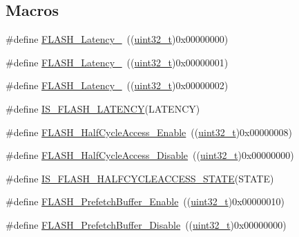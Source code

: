 \subsection*{Macros}
\begin{DoxyCompactItemize}
\item 
\#define \hyperlink{group___flash___latency_ga09afe6e52b819cc074f6111ec42ac3c3}{F\+L\+A\+S\+H\+\_\+\+Latency\+\_}~((\hyperlink{_p_e___types_8h_a33594304e786b158f3fb30289278f5af}{uint32\+\_\+t})0x00000000)
\item 
\#define \hyperlink{group___flash___latency_ga6b7281665340fe8f7919bdfcfd06f8e6}{F\+L\+A\+S\+H\+\_\+\+Latency\+\_}~((\hyperlink{_p_e___types_8h_a33594304e786b158f3fb30289278f5af}{uint32\+\_\+t})0x00000001)
\item 
\#define \hyperlink{group___flash___latency_ga55173ebb5c978459ce18d5e2516e3e89}{F\+L\+A\+S\+H\+\_\+\+Latency\+\_}~((\hyperlink{_p_e___types_8h_a33594304e786b158f3fb30289278f5af}{uint32\+\_\+t})0x00000002)
\item 
\#define \hyperlink{group___flash___latency_gafcbd098d482318a622a58bf168547389}{I\+S\+\_\+\+F\+L\+A\+S\+H\+\_\+\+L\+A\+T\+E\+N\+CY}(L\+A\+T\+E\+N\+CY)
\item 
\#define \hyperlink{group___half___cycle___enable___disable_ga95adf58ccf48094a9648085ac8d8af13}{F\+L\+A\+S\+H\+\_\+\+Half\+Cycle\+Access\+\_\+\+Enable}~((\hyperlink{_p_e___types_8h_a33594304e786b158f3fb30289278f5af}{uint32\+\_\+t})0x00000008)
\item 
\#define \hyperlink{group___half___cycle___enable___disable_gad1ec816fa04b9a45e51c1cc9f1ba8f42}{F\+L\+A\+S\+H\+\_\+\+Half\+Cycle\+Access\+\_\+\+Disable}~((\hyperlink{_p_e___types_8h_a33594304e786b158f3fb30289278f5af}{uint32\+\_\+t})0x00000000)
\item 
\#define \hyperlink{group___half___cycle___enable___disable_gad1b9e84a20436dcfe1a1ade4c26dc028}{I\+S\+\_\+\+F\+L\+A\+S\+H\+\_\+\+H\+A\+L\+F\+C\+Y\+C\+L\+E\+A\+C\+C\+E\+S\+S\+\_\+\+S\+T\+A\+TE}(S\+T\+A\+TE)
\item 
\#define \hyperlink{group___prefetch___buffer___enable___disable_gad0fac43d078a77794f22840f326a6ed9}{F\+L\+A\+S\+H\+\_\+\+Prefetch\+Buffer\+\_\+\+Enable}~((\hyperlink{_p_e___types_8h_a33594304e786b158f3fb30289278f5af}{uint32\+\_\+t})0x00000010)
\item 
\#define \hyperlink{group___prefetch___buffer___enable___disable_ga2feb631ad85449f83517f05aaf4ba26c}{F\+L\+A\+S\+H\+\_\+\+Prefetch\+Buffer\+\_\+\+Disable}~((\hyperlink{_p_e___types_8h_a33594304e786b158f3fb30289278f5af}{uint32\+\_\+t})0x00000000)

\end{DoxyCompactItemize}
